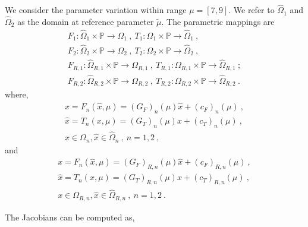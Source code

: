 \documentclass[a4paper,oneside,openright,spanish,english]{book}
\begin{document}
We consider the parameter variation within range $\mu = [7,9]$. We refer to $\hat{\Omega}_1$ and $\hat{\Omega}_2$ as the domain at reference parameter $\tilde{\mu}$. The parametric mappings are
\begin{equation}
\begin{split}
F_1 : \hat{\Omega}_1 \times \mathbb{P} \rightarrow \Omega_1 \ , \
T_1 : \Omega_1 \times \mathbb{P} \rightarrow \hat{\Omega}_1 \ , \\
F_2 : \hat{\Omega}_2 \times \mathbb{P} \rightarrow \Omega_2 \ , \
T_2 : \Omega_2 \times \mathbb{P} \rightarrow \hat{\Omega}_2 \ , \\
F_{R,1} : \hat{\Omega}_{R,1} \times \mathbb{P} \rightarrow \Omega_{R,1} \ , \
T_{R,1} : \Omega_{R,1} \times \mathbb{P} \rightarrow \hat{\Omega}_{R,1} \ ; \\
F_{R,2} : \hat{\Omega}_{R,2} \times \mathbb{P} \rightarrow \Omega_{R,2} \ , \
T_{R,2} : \Omega_{R,2} \times \mathbb{P} \rightarrow \hat{\Omega}_{R,2} \ .
\end{split}
\end{equation}
where, 
\begin{equation}
\begin{split}
x = F_n(\hat{x},\mu) = (G_F)_n(\mu) \hat{x} + (c_F)_n(\mu) \ , \\
\hat{x} = T_n(x,\mu) = (G_T)_n(\mu) x + (c_T)_n(\mu) \ ,\\
x \in \Omega_n, \hat{x} \in \hat{\Omega}_n \ , \ n = 1,2 \ ,
\end{split}
\end{equation}
and
\begin{equation}
\begin{split}
x = F_n(\hat{x},\mu) = (G_F)_{R,n}(\mu) \hat{x} + (c_F)_{R,n}(\mu) \ , \\
\hat{x} = T_n(x,\mu) = (G_T)_{R,n}(\mu) x + (c_T)_{R,n}(\mu) \ , \\
x \in \Omega_{R,n}, \hat{x} \in \hat{\Omega}_{R,n} \ , \ n = 1,2 \ .
\end{split}
\end{equation}

The Jacobians can be computed as,
\end{document}

